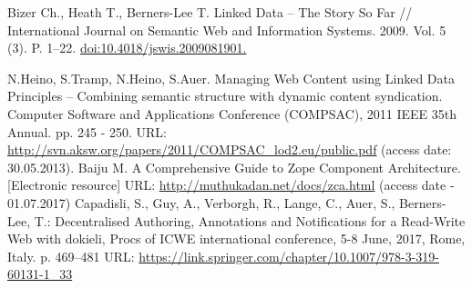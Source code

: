 \documentclass[12pt]{llncs}
\begin{document}
\begin{thebibliography}{99}
 Bizer Ch., Heath T., Berners-Lee T. Linked Data -- The Story So
  Far // International Journal on Semantic Web and Information Systems.
  2009. Vol. 5 (3). P. 1--22. \url{doi:10.4018/jswis.2009081901. }

 N.Heino, S.Tramp, N.Heino, S.Auer. Managing Web Content using Linked Data Principles – Combining semantic structure with dynamic content syndication. Computer Software and Applications Conference (COMPSAC), 2011 IEEE 35th Annual. pp. 245 - 250. URL: \url{http://svn.aksw.org/papers/2011/COMPSAC_lod2.eu/public.pdf} (access date: 30.05.2013).
  Baiju M. A Comprehensive Guide to Zope Component Architecture.
  [Electronic resource]
URL: \url{http://muthukadan.net/docs/zca.html} (access date - 01.07.2017)
  Capadisli, S., Guy, A., Verborgh, R., Lange, C., Auer, S., Berners-Lee, T.: Decentralised Authoring, Annotations and Notifications for a Read-Write Web with dokieli, Procs of ICWE international conference, 5-8 June, 2017, Rome, Italy. p. 469--481 URL: \url{https://link.springer.com/chapter/10.1007/978-3-319-60131-1_33}




\end{thebibliography}
\end{document}
